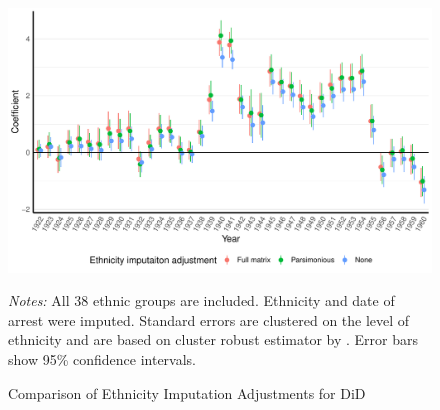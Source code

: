  \begin{figure}[H]
\centering
\caption{Comparison of  Ethnicity Imputation Adjustments for DiD}
\includegraphics[width=\textwidth]{plots/effects/robustness_checks/pred_adj_comp_pred_full_imp_date_cr2.pdf}
\begin{minipage}{0.92\textwidth}
\footnotesize
\emph{Notes:} All 38 ethnic groups are included. Ethnicity and date of arrest were imputed.   Standard errors are clustered on the level of ethnicity and are based on cluster robust estimator by \citet{pustejovsky_small-sample_2018}. Error bars show 95\% confidence intervals. 
\end{minipage}
\label{fig:did_robustness_pred_adj}
\end{figure}


%


